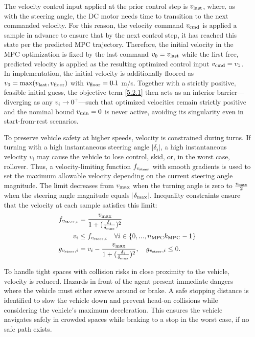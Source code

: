 \documentclass[journal]{IEEEtran}
\begin{document}
The velocity control input applied at the prior control step is $v_\textup{last}$, where, as with the steering angle, the DC motor needs time to transition to the next commanded velocity. For this reason, the velocity command $v_\textup{cmd}$ is applied a sample in advance to ensure that by the next control step, it has reached this state per the predicted MPC trajectory. Therefore, the initial velocity in the MPC optimization is fixed by the last command $v_0=v_\textup{last}$ while the first free, predicted velocity is applied as the resulting optimized control input $v_\textup{cmd}=v_1$. In implementation, the initial velocity is additionally floored as $v_0=\max(v_\textup{last},v_\textup{floor})$ with $v_\textup{floor}=0.1$ m/s. Together with a strictly positive, feasible initial guess, the objective term \eqref{5.2.1} then acts as an interior barrier---diverging as any $v_i\rightarrow0^+$---such that optimized velocities remain strictly positive and the nominal bound $v_\textup{min}=0$ is never active, avoiding its singularity even in start-from-rest scenarios.

To preserve vehicle safety at higher speeds, velocity is constrained during turns. If turning with a high instantaneous steering angle $|\delta_i|$, a high instantaneous velocity $v_i$ may cause the vehicle to lose control, skid, or, in the worst case, rollover. Thus, a velocity-limiting function $f_{v_\textup{steer}}$ with smooth gradients is used to set the maximum allowable velocity depending on the current steering angle magnitude. The limit decreases from $v_\textup{max}$ when the turning angle is zero to $\frac{v_\textup{max}}{2}$ when the steering angle magnitude equals $|\delta_\textup{max}|$. Inequality constraints ensure that the velocity at each sample satisfies this limit:
\begin{subequations}
\begin{align}
    f_{v_{\textup{steer},i}}&=\frac{v_\textup{max}}{1+(\frac{\delta_i}{\delta_\textup{max}})^2}\\
    v_i&\leq f_{v_{\textup{steer},i}} \quad \forall i\in\{0,...,n_\textup{MPC}k_\textup{MPC}-1\}  \nonumber \\
    g_{v_\textup{steer},i}&=v_i-\frac{v_\textup{max}}{1+(\frac{\delta_i}{\delta_\textup{max}})^2},\quad g_{v_\textup{steer},i}\leq0.
    \label{5.3.5}
\end{align}
\end{subequations}

To handle tight spaces with collision risks in close proximity to the vehicle, velocity is reduced. Hazards in front of the agent present immediate dangers where the vehicle must either swerve around or brake. A safe stopping distance is identified to slow the vehicle down and prevent head-on collisions while considering the vehicle's maximum deceleration. This ensures the vehicle navigates safely in crowded spaces while braking to a stop in the worst case, if no safe path exists.
\end{document}
